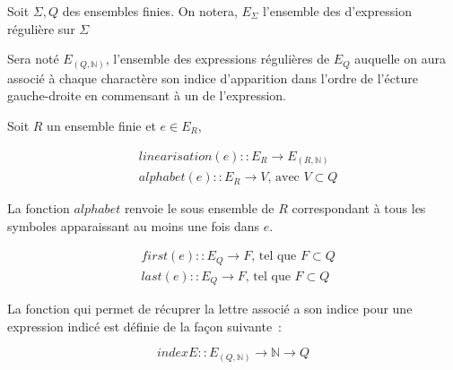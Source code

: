 \documentclass{article}
\begin{document}
Soit \(\Sigma, Q\) des ensembles finies. On notera, \(E_{\Sigma}\) l'ensemble 
des d'expression régulière sur \(\Sigma\)

Sera noté \(E_{(Q, \mathbb{N})}\), l'ensemble des expressions régulières de 
\(E_Q\) auquelle on aura associé à chaque charactère son indice d'apparition 
dans l'ordre de l'écture gauche-droite en commensant à un de l'expression.

Soit \(R\) un ensemble finie et \(e \in E_R\),

\begin{equation*}
  \begin{split}
  & linearisation(e) :: E_R \to E_{(R, \mathbb{N})} \\
  & alphabet(e) :: E_R \to V \text{, avec } V \subset Q
  \end{split}
\end{equation*}

La fonction \(alphabet\) renvoie le sous ensemble de \(R\) correspondant à tous 
les symboles apparaissant au moins une fois dans \(e\).

\begin{equation*}
  \begin{split}
  & first(e) :: E_Q \to F \text{, tel que } F \subset Q \\
  & last(e) :: E_Q \to F \text{, tel que } F \subset Q
  \end{split}
\end{equation*}

La fonction qui permet de récuprer la lettre associé a son indice pour une 
expression indicé est définie de la façon suivante~:

\[
indexE :: E_{(Q, \mathbb{N})} \to \mathbb{N} \to Q
\]
\end{document}
